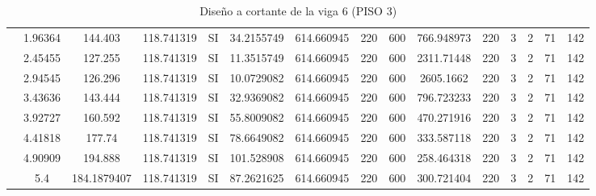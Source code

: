\begin{table}[H]
{\begin{tabular}{|c|c|c|c|c|c|c|c|c|c|c|c|c|c|c|}
\cline{2-15}    & 1.96364 & 144.403 & 118.741319 & SI  & 34.2155749 & 614.660945 & 220 & 600 & 766.948973 & 220 & 3   & 2   & 71  & 142 \bigstrut\\
\cline{2-15}    & 2.45455 & 127.255 & 118.741319 & SI  & 11.3515749 & 614.660945 & 220 & 600 & 2311.71448 & 220 & 3   & 2   & 71  & 142 \bigstrut\\
\cline{2-15}    & 2.94545 & 126.296 & 118.741319 & SI  & 10.0729082 & 614.660945 & 220 & 600 & 2605.1662 & 220 & 3   & 2   & 71  & 142 \bigstrut\\
\cline{2-15}    & 3.43636 & 143.444 & 118.741319 & SI  & 32.9369082 & 614.660945 & 220 & 600 & 796.723233 & 220 & 3   & 2   & 71  & 142 \bigstrut\\
\cline{2-15}    & 3.92727 & 160.592 & 118.741319 & SI  & 55.8009082 & 614.660945 & 220 & 600 & 470.271916 & 220 & 3   & 2   & 71  & 142 \bigstrut\\
\cline{2-15}    & 4.41818 & 177.74 & 118.741319 & SI  & 78.6649082 & 614.660945 & 220 & 600 & 333.587118 & 220 & 3   & 2   & 71  & 142 \bigstrut\\
\cline{2-15}    & 4.90909 & 194.888 & 118.741319 & SI  & 101.528908 & 614.660945 & 220 & 600 & 258.464318 & 220 & 3   & 2   & 71  & 142 \bigstrut\\
\cline{2-15}    & 5.4 & 184.1879407 & 118.741319 & SI  & 87.2621625 & 614.660945 & 220 & 600 & 300.721404 & 220 & 3   & 2   & 71  & 142 \bigstrut\\
\hline
\end{tabular}%


  

  }%
    \caption{Diseño a cortante de la viga 6 (PISO 3) }
  \label{tab:C VG6 P3 }%
\end{table}%

